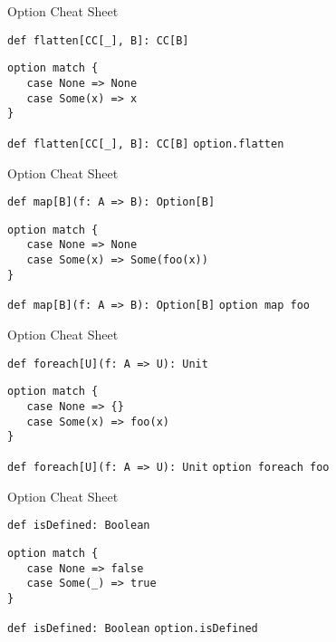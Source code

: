 \begin{frame}[fragile]{Option Cheat Sheet}
\begin{alertblock}{\lstinline!def flatten[CC[_], B]: CC[B]!}
\begin{lstlisting}
option match {
   case None => None
   case Some(x) => x
}
\end{lstlisting}
\end{alertblock}
\begin{exampleblock}{\lstinline!def flatten[CC[_], B]: CC[B]!}
\lstinline!option.flatten!
\end{exampleblock}
\end{frame}

\begin{frame}[fragile]{Option Cheat Sheet}
\begin{alertblock}{\lstinline!def map[B](f: A => B): Option[B]!}
\begin{lstlisting}
option match {
   case None => None
   case Some(x) => Some(foo(x))
}
\end{lstlisting}
\end{alertblock}
\begin{exampleblock}{\lstinline!def map[B](f: A => B): Option[B]!}
\lstinline!option map foo!
\end{exampleblock}
\end{frame}

\begin{frame}[fragile]{Option Cheat Sheet}
\begin{alertblock}{\lstinline!def foreach[U](f: A => U): Unit!}
\begin{lstlisting}
option match {
   case None => {}
   case Some(x) => foo(x)
}
\end{lstlisting}
\end{alertblock}
\begin{exampleblock}{\lstinline!def foreach[U](f: A => U): Unit!}
\lstinline!option foreach foo!
\end{exampleblock}
\end{frame}

\begin{frame}[fragile]{Option Cheat Sheet}
\begin{alertblock}{\lstinline!def isDefined: Boolean!}
\begin{lstlisting}
option match {
   case None => false
   case Some(_) => true
}
\end{lstlisting}
\end{alertblock}
\begin{exampleblock}{\lstinline!def isDefined: Boolean!}
\lstinline!option.isDefined!
\end{exampleblock}
\end{frame}


